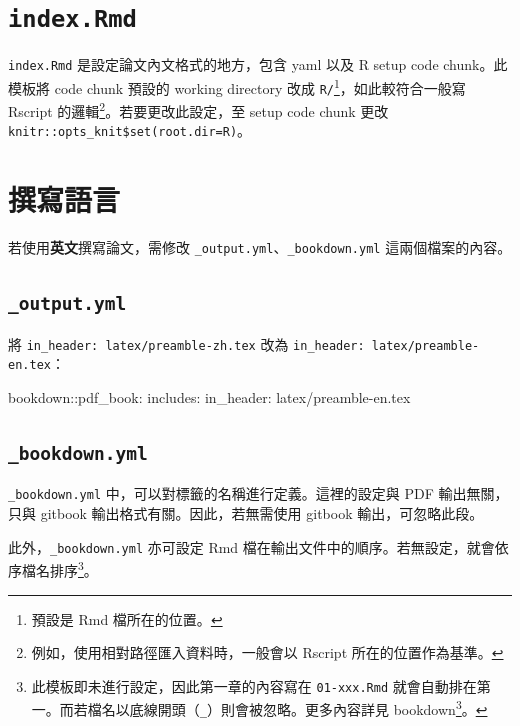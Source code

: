 \documentclass[oneside]{book}
\newenvironment{Shaded}{\begin{snugshade}}{\end{snugshade}}
\newcommand{\FunctionTok}[1]{\textcolor[rgb]{0.00,0.00,0.00}{#1}}
\newcommand{\AttributeTok}[1]{\textcolor[rgb]{0.77,0.63,0.00}{#1}}
\renewcommand{\href}[2]{#2\footnote{\url{#1}}}
\theoremstyle{definition}
\theoremstyle{definition}
\theoremstyle{definition}
\theoremstyle{remark}
\begin{document}
\section{\texorpdfstring{\texttt{index.Rmd}}{index.Rmd}}\label{index-rmd}

\texttt{index.Rmd} 是設定論文內文格式的地方，包含 yaml 以及 R setup code
chunk。此模板將 code chunk 預設的 working directory 改成
\texttt{R/}\footnote{預設是 Rmd 檔所在的位置。}，如此較符合一般寫
Rscript 的邏輯\footnote{例如，使用相對路徑匯入資料時，一般會以 Rscript
  所在的位置作為基準。}。若要更改此設定，至 setup code chunk 更改
\texttt{knitr::opts\_knit\$set(root.dir=\textquotesingle{}R\textquotesingle{})}。

\section{撰寫語言}\label{write-lang}

若使用\textbf{英文}撰寫論文，需修改
\texttt{\_output.yml}、\texttt{\_bookdown.yml} 這兩個檔案的內容。

\subsection{\texorpdfstring{\texttt{\_output.yml}}{\_output.yml}}\label{output.yml}

將 \texttt{in\_header:\ latex/preamble-zh.tex} 改為
\texttt{in\_header:\ latex/preamble-en.tex}：

\begin{Shaded}
\begin{Highlighting}[]
\FunctionTok{bookdown:}\AttributeTok{:pdf_book:}
  \FunctionTok{includes:}
    \FunctionTok{in_header:}\AttributeTok{ latex/preamble-en.tex}
\end{Highlighting}
\end{Shaded}

\subsection{\texorpdfstring{\texttt{\_bookdown.yml}}{\_bookdown.yml}}\label{bookdown.yml}

\texttt{\_bookdown.yml} 中，可以對標籤的名稱進行定義。這裡的設定與 PDF
輸出無關，只與 gitbook 輸出格式有關。因此，若無需使用 gitbook
輸出，可忽略此段。

此外，\texttt{\_bookdown.yml} 亦可設定 Rmd
檔在輸出文件中的順序。若無設定，就會依序檔名排序\footnote{此模板即未進行設定，因此第一章的內容寫在
  \texttt{01-xxx.Rmd}
  就會自動排在第一。而若檔名以底線開頭（\texttt{\_}）則會被忽略。更多內容詳見
  \href{https://bookdown.org/yihui/bookdown/usage.html}{bookdown}。}。
\end{document}
